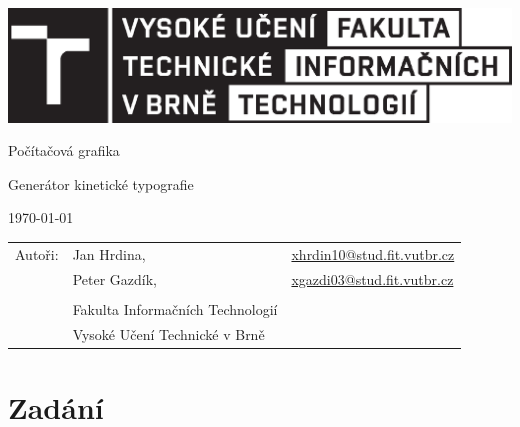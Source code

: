\documentclass[12pt,a4paper,titlepage,final]{report}
\makeatletter
\newcommand\Course{Počítačová grafika}
\newcommand\WorkTitle{Generátor kinetické typografie}
\newcommand\AuthorA{Jan Hrdina}
\newcommand\AuthorAEmail{xhrdin10@stud.fit.vutbr.cz}
\newcommand\AuthorB{Peter Gazdík}
\newcommand\AuthorBEmail{xgazdi03@stud.fit.vutbr.cz}
\newcommand\Faculty{Fakulta Informačních Technologií}
\newcommand\School{Vysoké Učení Technické v Brně}
\makeatother
\begin{document}
	\begin{titlepage}
	\begin{center}
		\includegraphics[width=14cm]{images/logo.eps}
	\end{center}
	\vfill
	\begin{center}
		\begin{Large}
			\Course\\
		\end{Large}
		\bigskip
		\begin{Huge}
			\WorkTitle\\
		\end{Huge}
	\end{center}
	\vfill
	\begin{center}
		\begin{large}
			\today
		\end{large}
	\end{center}
	\vfill
	\begin{flushleft}
		\begin{large}
			\begin{tabular}{lll}
				Autoři: & \AuthorA, & \url{\AuthorAEmail} \\
				        & \AuthorB, & \url{\AuthorBEmail} \\
				& & \\
				& \Faculty \\
				& \School \\
			\end{tabular}
		\end{large}
	\end{flushleft}
\end{titlepage}



\newpage
\chapter{Zadání}
\end{document}

